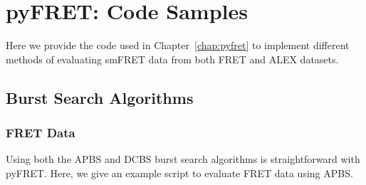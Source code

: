 \chapter{pyFRET: Code Samples}
\label{app:code_samples}

Here we provide the code used in Chapter~\ref{chap:pyfret} to implement different methods of evaluating smFRET data from both FRET and ALEX datasets.

\section{Burst Search Algorithms}
\label{app:burst_search}
\subsection{FRET Data}
Using both the APBS and DCBS burst search algorithms is straightforward with pyFRET. Here, we give an example script to evaluate FRET data using APBS.

